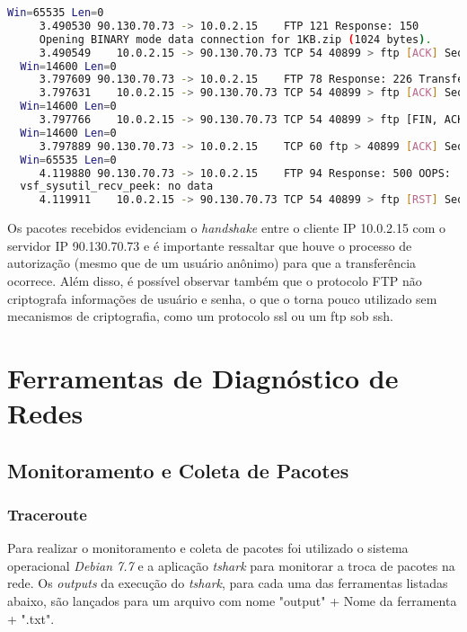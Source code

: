 \documentclass[a4paper]{report} %
\begin{document}
\begin{lstlisting}[language=bash]
  Win=65535 Len=0
     3.490530 90.130.70.73 -> 10.0.2.15    FTP 121 Response: 150
     Opening BINARY mode data connection for 1KB.zip (1024 bytes).
     3.490549    10.0.2.15 -> 90.130.70.73 TCP 54 40899 > ftp [ACK] Seq=83 Ack=264
  Win=14600 Len=0
     3.797609 90.130.70.73 -> 10.0.2.15    FTP 78 Response: 226 Transfer complete.
     3.797631    10.0.2.15 -> 90.130.70.73 TCP 54 40899 > ftp [ACK] Seq=83 Ack=288
  Win=14600 Len=0
     3.797766    10.0.2.15 -> 90.130.70.73 TCP 54 40899 > ftp [FIN, ACK] Seq=83 Ack=288
  Win=14600 Len=0
     3.797889 90.130.70.73 -> 10.0.2.15    TCP 60 ftp > 40899 [ACK] Seq=288 Ack=84
  Win=65535 Len=0
     4.119880 90.130.70.73 -> 10.0.2.15    FTP 94 Response: 500 OOPS:
  vsf_sysutil_recv_peek: no data
     4.119911    10.0.2.15 -> 90.130.70.73 TCP 54 40899 > ftp [RST] Seq=84 Win=0 Len=0

\end{lstlisting}

	Os pacotes recebidos evidenciam o \textit{handshake} entre o cliente IP 10.0.2.15 com o servidor IP 90.130.70.73 e é importante ressaltar que houve o processo de autorização (mesmo que de um usuário anônimo) para que a transferência ocorrece. Além disso, é possível observar também que o protocolo FTP não criptografa informações de usuário e senha, o que o torna pouco utilizado sem mecanismos de criptografia, como um protocolo ssl ou um ftp sob ssh.

\chapter{Ferramentas de Diagnóstico de Redes}
\label{chap_segundo}

\section{Monitoramento e Coleta de Pacotes}
\label{sec_segundo_monitoramento}

\subsection{Traceroute}
Para realizar o monitoramento e coleta de pacotes foi utilizado o sistema operacional \textit{Debian 7.7} e a aplicação \textit{tshark} para monitorar a troca de pacotes na rede.
Os \textit{outputs} da execução do \textit{tshark}, para cada uma das ferramentas listadas abaixo, são lançados para um arquivo com nome "output" + Nome da ferramenta + ".txt".
\end{document}
